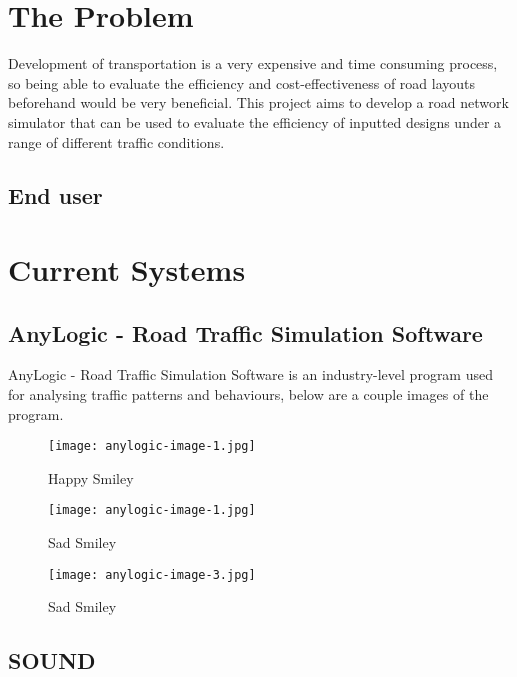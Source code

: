 \section{The Problem}

    Development of transportation is a very expensive and time consuming process, so being able to evaluate the efficiency and cost-effectiveness of road layouts beforehand would be very beneficial. This project aims to develop a road network simulator that can be used to evaluate the efficiency of inputted designs under a range of different traffic conditions.

    \subsection{End user}

\section{Current Systems}

    \subsection{AnyLogic - Road Traffic Simulation Software}

        AnyLogic - Road Traffic Simulation Software \cite{AnyLogic} is an industry-level program used for analysing traffic patterns and behaviours, below are a couple images of the program.

        \begin{figure}[ht]
            \centering
            \begin{minipage}{0.3\textwidth}
                \texttt{[image: anylogic-image-1.jpg]}
                \caption{Happy Smiley}
            \end{minipage}
            \begin{minipage}{0.3\textwidth}
                \texttt{[image: anylogic-image-1.jpg]}
                \caption{Sad Smiley}
            \end{minipage}
            \begin{minipage}{0.3\textwidth}
                \texttt{[image: anylogic-image-3.jpg]}
                \caption{Sad Smiley}
            \end{minipage}
        \end{figure}

    \subsection{SOUND}

